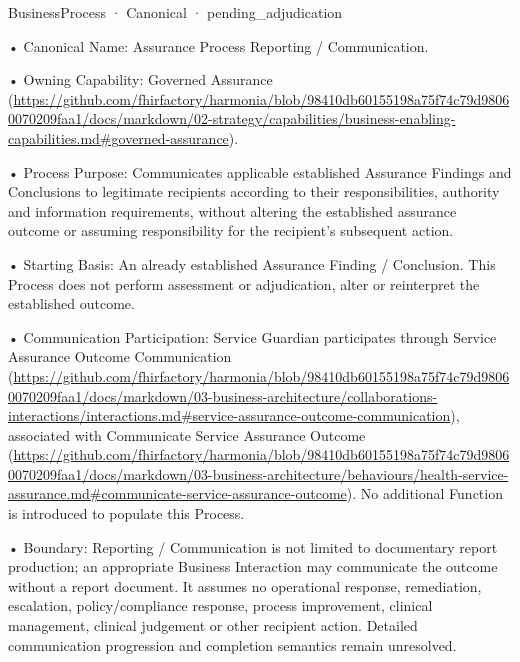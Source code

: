 \label{element:2fc0b626577b43feb050bcd91ac2b0a9}
{\small BusinessProcess · Canonical · pending\_adjudication}\par

•
Canonical Name: Assurance Process Reporting / Communication.



•
Owning Capability: Governed Assurance (\url{https://github.com/fhirfactory/harmonia/blob/98410db60155198a75f74c79d98060070209faa1/docs/markdown/02-strategy/capabilities/business-enabling-capabilities.md#governed-assurance}).



•
Process Purpose: Communicates applicable established Assurance Findings and Conclusions to legitimate recipients according to their responsibilities, authority and information requirements, without altering the established assurance outcome or assuming responsibility for the recipient's subsequent action.



•
Starting Basis: An already established Assurance Finding / Conclusion. This Process does not perform assessment or adjudication, alter or reinterpret the established outcome.



•
Communication Participation: Service Guardian participates through Service Assurance Outcome Communication (\url{https://github.com/fhirfactory/harmonia/blob/98410db60155198a75f74c79d98060070209faa1/docs/markdown/03-business-architecture/collaborations-interactions/interactions.md#service-assurance-outcome-communication}), associated with Communicate Service Assurance Outcome (\url{https://github.com/fhirfactory/harmonia/blob/98410db60155198a75f74c79d98060070209faa1/docs/markdown/03-business-architecture/behaviours/health-service-assurance.md#communicate-service-assurance-outcome}). No additional Function is introduced to populate this Process.



•
Boundary: Reporting / Communication is not limited to documentary report production; an appropriate Business Interaction may communicate the outcome without a report document. It assumes no operational response, remediation, escalation, policy/compliance response, process improvement, clinical management, clinical judgement or other recipient action. Detailed communication progression and completion semantics remain unresolved.




